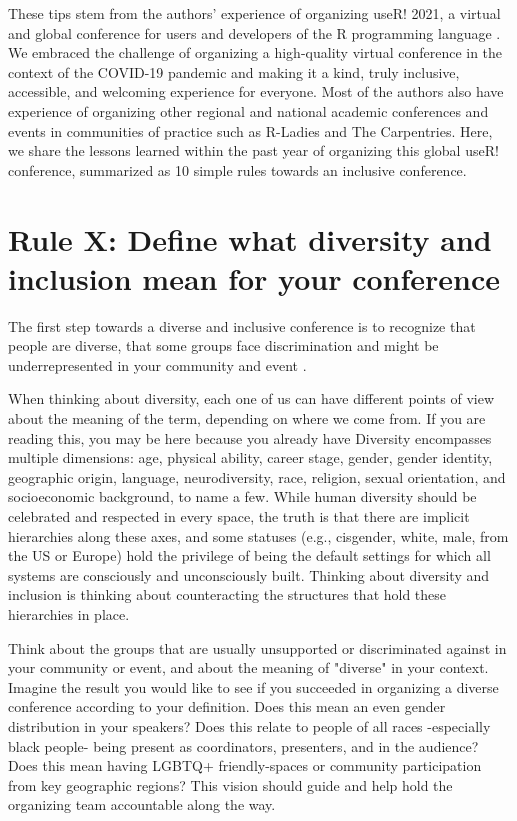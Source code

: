 \documentclass[10pt,letterpaper]{article}
\begin{document}
These tips stem from the authors' experience of organizing useR! 2021, a virtual and global conference for users and developers of the R programming language \cite{r_core_team_2021}. We embraced the challenge of organizing a high-quality virtual conference in the context of the COVID-19 pandemic and making it a kind, truly inclusive, accessible, and welcoming experience for everyone. Most of the authors also have experience of organizing other regional and national academic conferences and events in communities of practice such as R-Ladies and The Carpentries. Here, we share the lessons learned within the past year of organizing this global useR! conference, summarized as 10 simple rules towards an inclusive conference.

\section{Rule X: Define what diversity and inclusion mean for your conference}
\label{rule_diversity}


The first step towards a diverse and inclusive conference is to recognize that people are diverse, that some groups face discrimination and might be underrepresented in your community and event \cite{timperleyHeMoanaPukepuke2020}. 

When thinking about diversity, each one of us can have different points of view about the meaning of the term, depending on where we come from. If you are reading this, you may be here because you already have 
Diversity encompasses multiple dimensions: age, physical ability, career stage, gender, gender identity,  geographic origin, language, neurodiversity, race, religion, sexual orientation, and socioeconomic background, to name a few. While human diversity should be celebrated and respected in every space, the truth is that there are implicit hierarchies along these axes, and some statuses (e.g., cisgender, white, male, from the US or Europe) hold the privilege of being the default settings for which all systems are consciously and unconsciously built. Thinking about diversity and inclusion is thinking about counteracting the structures that hold these hierarchies in place.


Think about the groups that are usually unsupported or discriminated against in your community or event, and about the meaning of "diverse" in your context. Imagine the result you would like to see if you succeeded in organizing a diverse conference according to your definition. Does this mean an even gender distribution in your speakers? Does this relate to people of all races -especially black people- being present as coordinators, presenters, and in the audience? Does this mean having LGBTQ+ friendly-spaces or community participation from key geographic regions? This vision should guide and help hold the organizing team accountable along the way.
\end{document}
